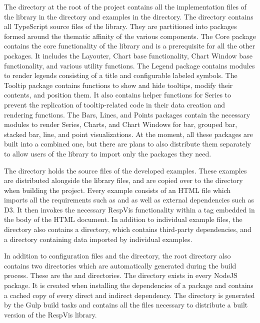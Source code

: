 The  directory at the root of the project contains all the
implementation files of the library in the  directory
and examples in the  directory. The
 directory contains all TypeScript source files of the
library. They are partitioned into packages formed around the thematic
affinity of the various components. The Core package
contains the core functionality of the library and is a prerequisite
for all the other packages. It includes the Layouter, Chart base
functionality, Chart Window base functionality, and various utility
functions. The Legend package contains modules to render
legends consisting of a title and configurable labeled symbols. The
Tooltip package contains functions to show and hide
tooltips, modify their contents, and position them. It also contains
helper functions for Series to prevent the replication of
tooltip-related code in their data creation and rendering functions.
The Bars, Lines, and Points packages
contain the necessary modules to render Series, Charts, and Chart
Windows for bar, grouped bar, stacked bar, line, and point
visualizations. At the moment, all these packages are built into a
combined one, but there are plans to also distribute them separately
to allow users of the library to import only the packages they need.

The  directory holds the source files of the
developed examples. These examples are distributed alongside the
library files, and are copied over to the 
directory when building the project. Every example consists of an HTML
file which imports all the requirements such as  and
 as well as external dependencies such as D3. It
then invokes the necessary RespVis functionality within a
 tag embedded in the body of the HTML document. In
addition to individual example files, the  directory
also contains a  directory, which contains third-party
dependencies, and a  directory containing data imported by
individual examples.

In addition to configuration files and the  directory, the
root directory also contains two directories which are automatically
generated during the build process. These are the 
and  directories. The  directory
exists in every NodeJS package. It is created when installing the
dependencies of a package and contains a cached copy of every
direct and indirect dependency. The  directory is
generated by the Gulp build tasks and contains all the files necessary
to distribute a built version of the RespVis library.

